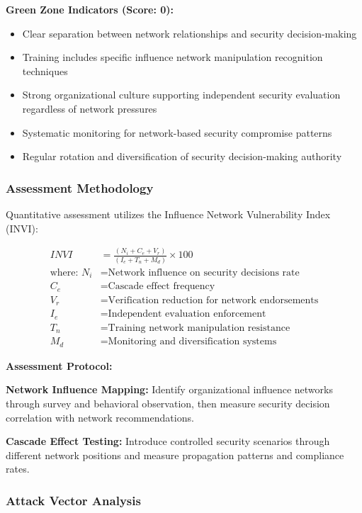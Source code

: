 \documentclass[11pt,a4paper]{article}
\begin{document}
\textbf{Green Zone Indicators (Score: 0):}
\begin{itemize}
\item Clear separation between network relationships and security decision-making
\item Training includes specific influence network manipulation recognition techniques
\item Strong organizational culture supporting independent security evaluation regardless of network pressures
\item Systematic monitoring for network-based security compromise patterns
\item Regular rotation and diversification of security decision-making authority
\end{itemize}

\subsubsection{Assessment Methodology}

Quantitative assessment utilizes the Influence Network Vulnerability Index (INVI):

\begin{align}
INVI &= \frac{(N_i + C_e + V_r)}{(I_e + T_n + M_d)} \times 100 \\
\text{where: } N_i &= \text{Network influence on security decisions rate} \\
C_e &= \text{Cascade effect frequency} \\
V_r &= \text{Verification reduction for network endorsements} \\
I_e &= \text{Independent evaluation enforcement} \\
T_n &= \text{Training network manipulation resistance} \\
M_d &= \text{Monitoring and diversification systems}
\end{align}

\textbf{Assessment Protocol:}

\textbf{Network Influence Mapping:} Identify organizational influence networks through survey and behavioral observation, then measure security decision correlation with network recommendations.

\textbf{Cascade Effect Testing:} Introduce controlled security scenarios through different network positions and measure propagation patterns and compliance rates.

\subsubsection{Attack Vector Analysis}
\end{document}
